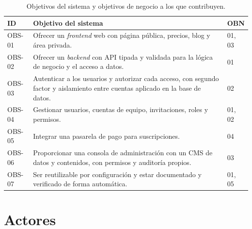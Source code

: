 \begin{table}[htbp]
  \centering
  \footnotesize
  \caption{Objetivos del sistema y objetivos de negocio a los que contribuyen.}
  \label{tab:req-obs}
  \begin{tabularx}{\textwidth}{@{}lXl@{}}
    \toprule
    \textbf{ID} & \textbf{Objetivo del sistema} & \textbf{OBN} \\
    \midrule
    OBS-01 & Ofrecer un \textit{frontend} web con página pública, precios, blog y área privada. & 01, 03 \\
    OBS-02 & Ofrecer un \textit{backend} con API tipada y validada para la lógica de negocio y el acceso a datos. & 01 \\
    OBS-03 & Autenticar a los usuarios y autorizar cada acceso, con segundo factor y aislamiento entre cuentas aplicado en la base de datos. & 02 \\
    OBS-04 & Gestionar usuarios, cuentas de equipo, invitaciones, roles y permisos. & 01, 02 \\
    OBS-05 & Integrar una pasarela de pago para suscripciones. & 04 \\
    OBS-06 & Proporcionar una consola de administración con un CMS de datos y contenidos, con permisos y auditoría propios. & 03 \\
    OBS-07 & Ser reutilizable por configuración y estar documentado y verificado de forma automática. & 01, 05 \\
    \bottomrule
  \end{tabularx}
\end{table}

\section{Actores}
\label{sec:req-actores}

